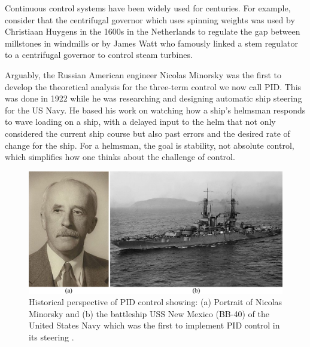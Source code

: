 \documentclass[12pt,letter]{article}
\begin{document}
\begin{review}
	\label{sec:control_systems_review}
	
		Continuous control systems have been widely used for centuries. For example, consider that the centrifugal governor which uses spinning weights was used by Christiaan Huygens in the 1600s in the Netherlands to regulate the gap between millstones in windmills or by James Watt who famously linked a stem regulator to a centrifugal governor to control steam turbines. 

		Arguably, the Russian American engineer Nicolas Minorsky was the first to develop the theoretical analysis for the three-term control we now call PID. This was done in 1922 while he was researching and designing automatic ship steering for the US Navy. He based his work on watching how a ship's helmsman responds to wave loading on a ship, with a delayed input to the helm that not only considered the current ship course but also past errors and the desired rate of change for the ship. For a helmsman, the goal is stability, not absolute control, which simplifies how one thinks about the challenge of control.
		
	\begin{figure}[H]
		\centering
		\includegraphics[width=6in]{../figures/PID_Nicolas_Minorsky_and_USS_New_Mexico}
		\caption{Historical perspective of PID control showing: (a) Portrait of Nicolas Minorsky \protect\footnotemark[1] and (b) the battleship USS New Mexico (BB-40) of the United States Navy which was the first to implement PID control in its steering \protect\footnotemark[2]. }
		\label{fig:PID_Nicolas_Minorsky_and_USS_New_Mexico}
	\end{figure}

	
\end{review}
\end{document}

